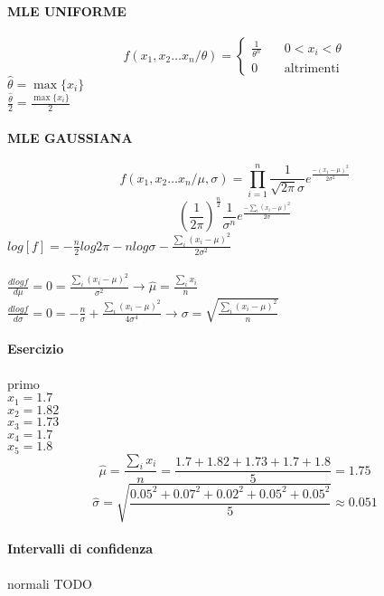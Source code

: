 \documentclass[]{article}
\begin{document}
    \paragraph{MLE UNIFORME}
    \begin{equation*}
        f(x_1, x_2 \ldots x_n / \theta) =
        \begin{cases}
                \frac{1}{\theta^n} & \quad 0 < x_i < \theta \\
                0 & \quad \text{altrimenti}
        \end{cases}
    \end{equation*}
    $\hat{\theta} = \max\{x_i\}$ \\
    $\frac{\hat{\theta}}{2} = \frac{\max\{ x_i\}}{2}$
    \paragraph{MLE GAUSSIANA}
    \[ f(x_1,x_2 \ldots x_n / \mu, \sigma) = \prod_{i=1}^{n} \frac{1}{\sqrt{2\pi} \sigma} e^{\frac{-(x_1 - \mu)^2}{2 \sigma^2}} \]
    \[ (\frac{1}{2 \pi})^{\frac{n}{2}} \frac{1}{\sigma^n} e^{\frac{-\sum_{i}^{}(x_i - \mu)^2}{2 \sigma}} \]
    $log[f] = - \frac{n}{2} log 2\pi - n log \sigma - \frac{\sum_{i}^{}(x_i - \mu)^2}{2\sigma^2}$ \\ \\
    $\frac{d log f}{d \mu} = 0 = \frac{\sum_{i}^{}(x_i - \mu)^2}{\sigma^2} \longrightarrow \hat{\mu} = \frac{\sum_{i}^{}x_i}{n}$ \\
    $\frac{d log f}{d \sigma} = 0 = - \frac{n}{\sigma} + \frac{\sum_{i}^{} (x_i - \mu)^2}{4 \sigma^4} \rightarrow \sigma = \sqrt{\frac{\sum_{i}^{}(x_i - \mu)^2}{n}}$
    \paragraph{Esercizio} primo \\
    $x_1 = 1.7$ \\
    $x_2 = 1.82$ \\
    $x_3 = 1.73$\\
    $x_4 = 1.7$\\
    $x_5 = 1.8$ \\
    \[ \hat{\mu} = \frac{\sum_{i}^{} x_i}{n} = \frac{1.7 + 1.82 + 1.73 + 1.7 + 1.8}{5} = 1.75 \]
    \[ \hat{\sigma} = \sqrt{\frac{0.05^2 + 0.07^2 + 0.02^2 + 0.05^2 + 0.05^2}{5}} \approx 0.051 \]
    \paragraph{Intervalli di confidenza} normali
    TODO
\end{document}
